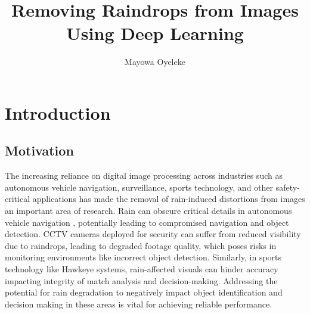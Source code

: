 \documentclass[11pt]{ociamthesis}  %
\title{Removing Raindrops from Images Using Deep Learning}     %
\author{Mayowa Oyeleke}             %
\begin{document}
\raggedbottom

\maketitle                  %

\begin{romanpages}          %
\tableofcontents            %
\listoffigures              %

\begin{alwayssingle}
    \printglossary[type =\acronymtype, title ={List of Acronyms}]
\end{alwayssingle}

\end{romanpages}            %


\chapter{Introduction}

\section{Motivation}

\label{Section:Motivation}
The increasing reliance on digital image processing across industries such as autonomous vehicle navigation, surveillance, sports technology, and other safety-critical applications has made the removal of rain-induced distortions from images an important area of research. Rain can obscure critical details in autonomous vehicle navigation \cite{article}, potentially leading to compromised navigation and object detection. CCTV cameras deployed for security can suffer from reduced visibility due to raindrops, leading to degraded footage quality, which poses risks in monitoring environments like incorrect object detection\cite{jia2012two}. Similarly, in sports technology like Hawkeye systems\cite{singh2012hawk}, rain-affected visuals can hinder accuracy impacting integrity of match analysis and decision-making. Addressing the potential for rain degradation to negatively impact object identification and decision making in these areas is vital for achieving reliable performance. 
\end{document}

